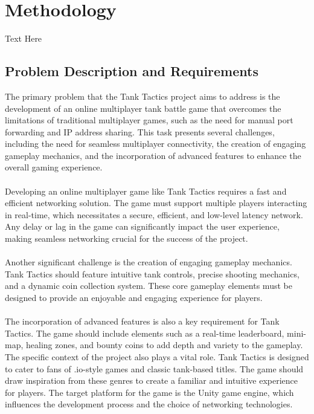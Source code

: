 \chapter{Methodology}
\label{ch:method} %
Text Here

\section{Problem Description and Requirements}

The primary problem that the Tank Tactics project aims to address is the development of an online multiplayer tank battle game that overcomes the limitations of traditional multiplayer games, such as the need for manual port forwarding and IP address sharing. This task presents several challenges, including the need for seamless multiplayer connectivity, the creation of engaging gameplay mechanics, and the incorporation of advanced features to enhance the overall gaming experience.
\\
\noindent
\\
Developing an online multiplayer game like Tank Tactics requires a fast and efficient networking solution. The game must support multiple players interacting in real-time, which necessitates a secure, efficient, and low-level latency network. Any delay or lag in the game can significantly impact the user experience, making seamless networking crucial for the success of the project.
\\
\noindent
\\
Another significant challenge is the creation of engaging gameplay mechanics. Tank Tactics should feature intuitive tank controls, precise shooting mechanics, and a dynamic coin collection system. These core gameplay elements must be designed to provide an enjoyable and engaging experience for players.
\\
\noindent
\\
The incorporation of advanced features is also a key requirement for Tank Tactics. The game should include elements such as a real-time leaderboard, mini-map, healing zones, and bounty coins to add depth and variety to the gameplay. The specific context of the project also plays a vital role. Tank Tactics is designed to cater to fans of .io-style games and classic tank-based titles. The game should draw inspiration from these genres to create a familiar and intuitive experience for players. The target platform for the game is the Unity game engine, which influences the development process and the choice of networking technologies.
